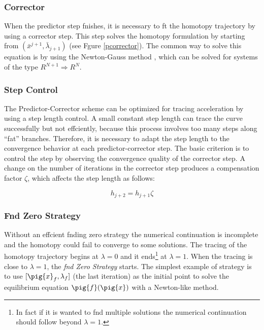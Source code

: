 \documentclass[conference]{IEEEtran}
\begin{document}
 
\subsubsection{Corrector}

When the predictor step fnishes, it is necessary to ft the homotopy trajectory by
using a corrector step. This step  solves the homotopy formulation by starting
from $(\bar{x}^{j+1},\bar{\lambda}_{j+1})$ (see Fgure \ref{pcorrector}). The common
way to solve this equation is by using the Newton-Gauss method \cite{homo_allgower}, which
can be solved for systems of the type $R^{N+1} \Rightarrow R^N$.

\subsubsection{Step Control}

The Predictor-Corrector scheme can be optimized for tracing acceleration by
using a step length control. A small constant step length can trace the curve successfully
but not effciently, because this process involves too many steps along ``fat'' branches.
Therefore, it is necessary to adapt the step length to the convergence behavior at each
predictor-corrector step. The basic criterion is to control the step by observing the
convergence quality of the corrector step. A change on the number of iterations in the corrector step produces
a compensation factor $\zeta$, which affects the step length as follows:


\begin{displaymath}
h_{j+2}=h_{j+1} \zeta
\label{zero}
\end{displaymath}


\subsubsection{Fnd Zero Strategy}

Without an effcient fnding zero strategy
the numerical continuation is incomplete and the homotopy could fail
to converge to some solutions.
The tracing of the homotopy trajectory begins at $\lambda=0$ and it ends\footnote{In fact if it is wanted to fnd multiple solutions the numerical continuation
should follow beyond $\lambda=1$.} at $\lambda=1$. When the tracing is close to $\lambda=1$, the {\it fnd Zero Strategy} starts. The simplest example
of strategy is to use $[\pig{x}_f,\lambda_f]$ (the last iteration) as the initial point
to solve the equilibrium equation $\pig{f}(\pig{x})$ with a Newton-like method. 
\end{document}
